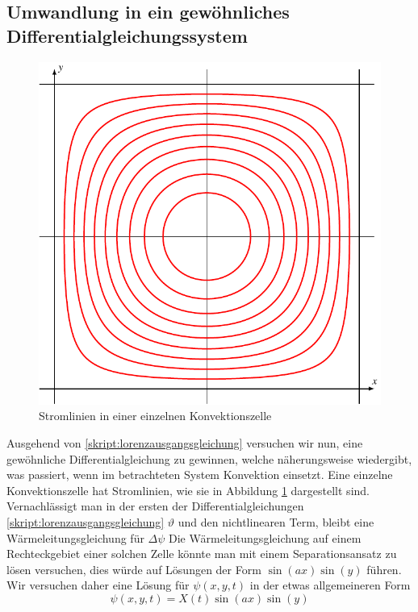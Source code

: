 \subsection{Umwandlung in ein gewöhnliches Differentialgleichungssystem}
\begin{figure}
\centering
\includegraphics{chapters/2/konvektion.pdf}
\caption{Stromlinien in einer einzelnen Konvektionszelle
\label{skript:stromlinien konvektion}}
\end{figure}
Ausgehend von
\eqref{skript:lorenzausgangsgleichung}
versuchen wir nun, eine gewöhnliche Differentialgleichung zu gewinnen,
welche näherungsweise wiedergibt, was passiert, wenn im betrachteten
System Konvektion einsetzt.
Eine einzelne Konvektionszelle hat Stromlinien, wie sie in Abbildung
\ref{skript:stromlinien konvektion}
dargestellt sind.
Vernachlässigt man in der
ersten der Differentialgleichungen
\eqref{skript:lorenzausgangsgleichung}
$\vartheta$ und den nichtlinearen Term, bleibt eine Wärmeleitungsgleichung
für $\Delta \psi$
Die Wärmeleitungsgleichung auf einem Rechteckgebiet 
einer solchen Zelle könnte man mit einem Separationsansatz zu lösen
versuchen, dies würde auf Lösungen der Form
$\sin(ax)\sin(y)$
führen.
Wir versuchen daher eine Lösung für $\psi(x,y,t)$ in der etwas
allgemeineren Form
\begin{equation}
\psi(x,y,t)
=
X(t) \sin(ax)\sin(y)
\label{skript:psiansatz}
\end{equation}
